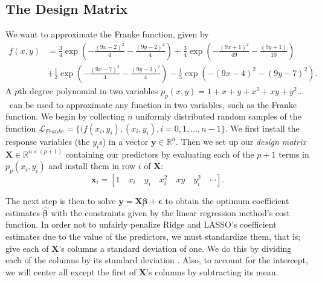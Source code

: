 \documentclass[]{article}
\begin{document}
\subsection{The Design Matrix}
We want to approximate the Franke function, given by
\begin{equation}
\label{franke}
\begin{aligned}
f(x,y) &= \frac{3}{4}\exp{\left(-\frac{(9x-2)^2}{4} - \frac{(9y-2)^2}{4}\right)}+\frac{3}{4}\exp{\left(-\frac{(9x+1)^2}{49}- \frac{(9y+1)}{10}\right)} \\
&+\frac{1}{2}\exp{\left(-\frac{(9x-7)^2}{4} - \frac{(9y-3)^2}{4}\right)} -\frac{1}{5}\exp{\left(-(9x-4)^2 - (9y-7)^2\right) }.
\end{aligned}
\end{equation}
A $p$th degree polynomial in two variables $p_p(x,y) = 1 + x + y + x^2 + xy + y^2 ...$ can be used to approximate any function in two variables, such as the Franke function. We begin by collecting $n$ uniformly distributed random samples of the function $\mathcal{L}_{Franke} = \{(f(x_i, y_i), (x_i, y_i), i=0,1,...,n-1\}$. We first install the response variables (the $y_i$s) in a vector $\mathbf{y} \in \mathbb{R}^n$. Then we set up our \textit{design matrix} $\mathbf{X} \in \mathbb{R}^{n \times (p+1)}$ containing our predictors by evaluating each of the $p+1$ terms in $p_p(x_i,y_i)$ and install them in row $i$ of $\mathbf{X}$:
\begin{equation}
\mathbf{x}_i = [1 \quad x_i \quad y_i \quad x_i^2 \quad xy \quad y_i^2 \quad \cdots].
\end{equation}

The next step is then to solve $\mathbf{y} = \mathbf{X\beta} + \mathbf{\epsilon}$ to obtain the optimum coefficient estimates $\mathbf{\hat{\beta}}$ with the constraints given by the linear regression method's cost function. In order not to unfairly penalize Ridge and LASSO's coefficient estimates due to the value of the predictors, we must standardize them, that is; give each of $\mathbf{X}$'s columns a standard deviation of one. We do this by dividing each of the columns by its standard deviation \cite{james2013introduction}. Also, to account for the intercept, we will center all except the first of $\mathbf{X}$'s columns by subtracting its mean.
\end{document}
